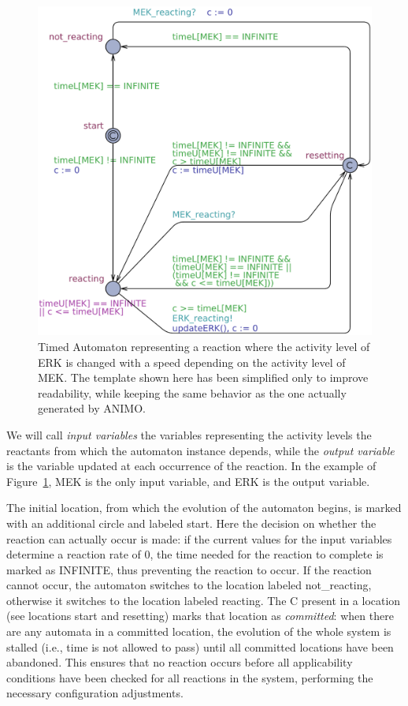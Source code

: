 \begin{figure}[htpb]
\begin{minipage}{\textwidth}
  \centering
  \includegraphics[width=.65\textwidth]{images/Reaction_MEK_ERK2}%
  \caption{Timed Automaton representing a reaction where the activity level of ERK is changed with a speed depending on
the activity level of MEK. The template shown here has been simplified only to improve readability, while keeping the
same behavior as the one actually generated by ANIMO.}\label{fig:ta-model-simpler}
\end{minipage}
\end{figure}

We will call \emph{input variables} the variables representing the activity levels the reactants from which the automaton instance
depends, while the \emph{output variable} is the variable updated at each occurrence of the reaction. In the
example of Figure~\ref{fig:ta-model-simpler}, {\sf MEK} is the only input variable, and {\sf ERK} is the output variable.

The initial location, from which the evolution of the automaton begins, is marked with an additional circle and labeled
{\sf start}. Here the decision on whether the reaction can actually occur is made: if
the current values for the input variables determine a reaction rate of $0$,
the time needed for the reaction to complete is marked as {\sf INFINITE}, thus preventing the reaction to occur. If the
reaction cannot occur, the automaton switches to the location labeled {\sf not\_reacting}, otherwise it switches
to the location labeled {\sf reacting}. The {\sf C} present in a location (see locations {\sf start} and
{\sf resetting}) marks that location as \emph{committed}: when there are any automata in a committed location, the
evolution of the whole system is stalled (i.e., time is not allowed to pass) until all committed locations have been
abandoned. This ensures that no reaction occurs before all applicability conditions have been checked for all reactions in
the system, performing the necessary configuration adjustments.

